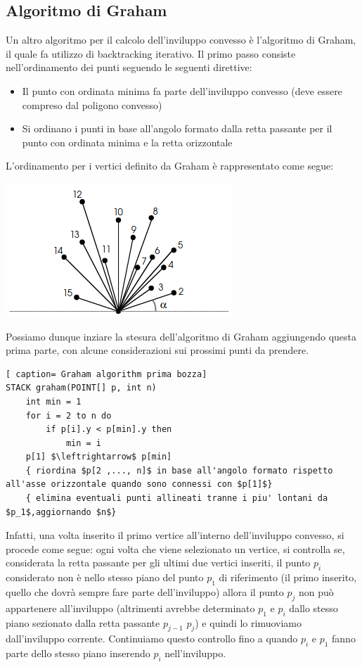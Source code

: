 \documentclass[../cheatSheetAlgoritmi.tex]{subfiles}
\begin{document}
\subsection{Algoritmo di Graham}
Un altro algoritmo per il calcolo dell'inviluppo convesso è l'algoritmo di Graham, il quale fa utilizzo di backtracking iterativo.
Il primo passo consiste nell'ordinamento dei punti seguendo le seguenti direttive:
\begin{itemize}
	\item Il punto con ordinata minima fa parte dell'inviluppo convesso (deve essere compreso dal poligono convesso)
	\item Si ordinano i punti in base all'angolo formato dalla retta passante per il punto con ordinata minima e la retta orizzontale
\end{itemize}
L'ordinamento per i vertici definito da Graham è rappresentato come segue:
\begin{center}
	\includegraphics{ ../img/backtracking_inviluppo_convesso_graham_1}
\end{center}
Possiamo dunque inziare la stesura dell'algoritmo di Graham aggiungendo questa prima parte, con alcune considerazioni sui prossimi punti da prendere. 
 \begin{lstlisting}[ caption= Graham algorithm prima bozza]
STACK graham(POINT[] p, int n)
	int min = 1
	for i = 2 to n do
		if p[i].y < p[min].y then 
			min = i
	p[1] $\leftrightarrow$ p[min]
	{ riordina $p[2 ,..., n]$ in base all'angolo formato rispetto all'asse orizzontale quando sono connessi con $p[1]$}
	{ elimina eventuali punti allineati tranne i piu' lontani da $p_1$,aggiornando $n$}
\end{lstlisting}
Infatti, una volta inserito il primo vertice all'interno dell'inviluppo convesso, si procede come segue: ogni volta che viene selezionato un vertice, si controlla se, considerata la retta passante per gli ultimi due vertici inseriti, il punto $p_i$ considerato non è nello stesso piano del punto $p_1$ di riferimento (il primo inserito, quello che dovrà sempre fare parte dell'inviluppo) allora il punto $p_j$ non può appartenere all'inviluppo (altrimenti avrebbe determinato $p_1$ e $p_i$ dallo stesso piano sezionato dalla retta passante $p_{j-1}$ $p_j$) e quindi lo rimuoviamo dall'inviluppo corrente. Continuiamo questo controllo fino a quando $p_i$ e $p_1$ fanno parte dello stesso piano inserendo $p_i$ nell'inviluppo. \\
\end{document}
